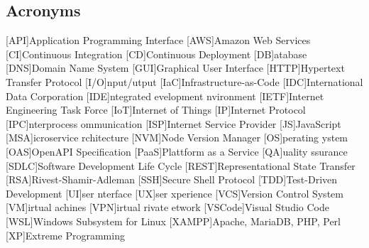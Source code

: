 \newcommand{\abbr}{Abbreviations}
\subsection{Acronyms}

\begin{acronym}[1234567890]		%
\setlength{\itemsep}{-\parsep}	%

[API]{Application Programming Interface}
[AWS]{Amazon Web Services}
[CI]{Continuous Integration}
[CD]{Continuous Deployment}
[DB]{atabase}
[DNS]{Domain Name System}
[GUI]{Graphical User Interface}
[HTTP]{Hypertext Transfer Protocol}
[I/O]{nput/utput}
[IaC]{Infrastructure-as-Code}
[IDC]{International Data Corporation}
[IDE]{ntegrated evelopment nvironment}
[IETF]{Internet Engineering Task Force}
[IoT]{Internet of Things}
[IP]{Internet Protocol}
[IPC]{nterprocess ommunication}
[ISP]{Internet Service Provider}
[JS]{JavaScript}
[MSA]{icroservice rchitecture}
[NVM]{Node Version Manager}
[OS]{perating ystem}
[OAS]{OpenAPI Specification}
[PaaS]{Plattform as a Service}
[QA]{uality ssurance}
[SDLC]{Software Development Life Cycle}
[REST]{Representational State Transfer}
[RSA]{Rivest-Shamir-Adleman}
[SSH]{Secure Shell Protocol}
[TDD]{Test-Driven Development}
[UI]{ser nterface}
[UX]{ser xperience}
[VCS]{Version Control System}
[VM]{irtual achines}
[VPN]{irtual rivate etwork}
[VSCode]{Visual Studio Code}
[WSL]{Windows Subsystem for Linux}
[XAMPP]{Apache, MariaDB, PHP, Perl}
[XP]{Extreme Programming}
\end{acronym}
